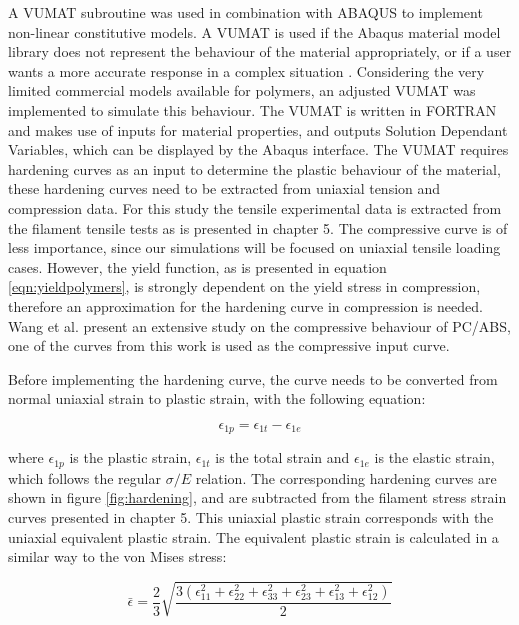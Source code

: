 A VUMAT subroutine was used in combination with ABAQUS to implement non-linear constitutive models. A VUMAT is used if the Abaqus material model library does not represent the behaviour of the material appropriately, or if a user wants a more accurate response in a complex situation \cite{SimuliaWritingAbaqus}. Considering the very limited commercial models available for polymers, an adjusted VUMAT was implemented to simulate this behaviour. The VUMAT is written in FORTRAN and makes use of inputs for material properties, and outputs Solution Dependant Variables, which can be displayed by the Abaqus interface. The VUMAT requires hardening curves as an input to determine the plastic behaviour of the material, these hardening curves need to be extracted from uniaxial tension and compression data. For this study the tensile experimental data is extracted from the filament tensile tests as is presented in chapter 5. The compressive curve is of less importance, since our simulations will be focused on uniaxial tensile loading cases. However, the yield function, as is presented in equation \ref{eqn:yieldpolymers}, is strongly dependent on the yield stress in compression, therefore an approximation for the hardening curve in compression is needed. Wang et al. \cite{Wang2016ExperimentalRates} present an extensive study on the compressive behaviour of PC/ABS, one of the curves from this work is used as the compressive input curve. 

Before implementing the hardening curve, the curve needs to be converted from normal uniaxial strain to plastic strain, with the following equation:

\begin{equation} \label{eqn:toplastic}
\epsilon_{1p}=\epsilon_{1t}-\epsilon_{1e}
\end{equation}

\noindent where $\epsilon_{1p}$ is the plastic strain, $\epsilon_{1t}$ is the total strain and $\epsilon_{1e}$ is the elastic strain, which follows the regular $\sigma/E$ relation. The corresponding hardening curves are shown in figure \ref{fig:hardening}, and are subtracted from the filament stress strain curves presented in chapter 5. This uniaxial plastic strain corresponds with the uniaxial equivalent plastic strain. The equivalent plastic strain is calculated in a similar way to the von Mises stress:

\begin{equation}\label{fig:eqstrain}
\bar\epsilon=\frac{2}{3}\sqrt{\frac{3(\epsilon_{11}^2+\epsilon_{22}^2+\epsilon_{33}^2+\epsilon_{23}^2+\epsilon_{13}^2+\epsilon_{12}^2)}{2}} 
\end{equation}

